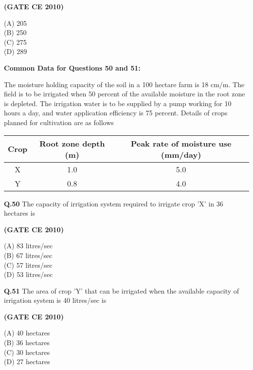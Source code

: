 \documentclass[journal,12pt,onecolumn]{exam}
\theoremstyle{remark}
\begin{document}
\setlength{\parskip}{0.5cm}

\hfill\textbf{(GATE CE 2010)}

\begin{multicols}{4}
\noindent(A) 205\\
(B) 250\\
(C) 275\\
(D) 289
\end{multicols}

\setlength{\parskip}{0.5cm}

\noindent\textbf{Common Data for Questions 50 and 51:}

\noindent The moisture holding capacity of the soil in a 100 hectare farm is 18 cm/m. The field is to be irrigated when 50 percent of the available moisture in the root zone is depleted. The irrigation water is to be supplied by a pump working for 10 hours a day, and water application efficiency is 75 percent. Details of crops planned for cultivation are as follows

\begin{center}
\begin{tabular}{|c|c|c|}
\hline
Crop & Root zone depth (m) & Peak rate of moisture use (mm/day) \\
\hline
X & 1.0 & 5.0 \\
Y & 0.8 & 4.0 \\
\hline
\end{tabular}
\end{center}

\noindent\textbf{Q.50} The capacity of irrigation system required to irrigate crop 'X' in 36 hectares is

\setlength{\parskip}{0.5cm}

\hfill\textbf{(GATE CE 2010)}

\begin{multicols}{4}
\noindent(A) 83 litres/sec\\
(B) 67 litres/sec\\
(C) 57 litres/sec\\
(D) 53 litres/sec
\end{multicols}

\setlength{\parskip}{0.5cm}

\noindent\textbf{Q.51} The area of crop 'Y' that can be irrigated when the available capacity of irrigation system is 40 litres/sec is

\setlength{\parskip}{0.5cm}

\hfill\textbf{(GATE CE 2010)}

\begin{multicols}{4}
\noindent(A) 40 hectares\\
(B) 36 hectares\\
(C) 30 hectares\\
(D) 27 hectares
\end{multicols}
\end{document}
